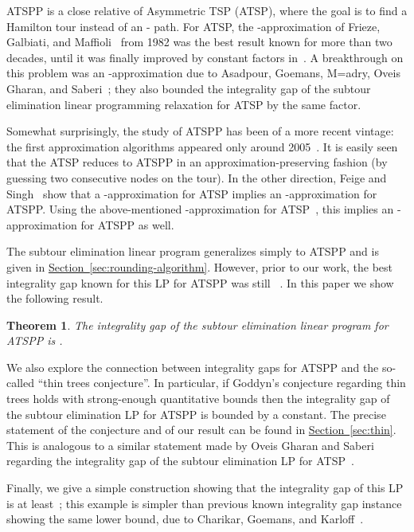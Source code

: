 \documentclass[11pt]{article}
\newcommand{\lref}[2][]{\hyperref[#2]{#1~\ref*{#2}}}
\newtheorem{theorem}{Theorem}[section]
\theoremstyle{definition}
\def\polhk#1{\setbox0=\hbox{#1}{\ooalign{\hidewidth\lower1.5ex\hbox{`}\hidewidth\crcr\unhbox0}}}
\begin{document}
ATSPP is a close relative of Asymmetric TSP
(ATSP), where the goal is to find a Hamilton tour instead of an -
path.  For ATSP, the -approximation of Frieze,
Galbiati, and Maffioli~\cite{FGM} from 1982 was the best result known
for more than two decades, until it was finally improved by constant
factors in~\cite{Blaser08,KLSS05,FS07}. A breakthrough on this problem
was an -approximation due to Asadpour, Goemans,
M{\polhk{a}}dry, Oveis Gharan, and Saberi~\cite{AGMSS}; they also
bounded the integrality gap of the subtour elimination linear
programming relaxation for ATSP by the same factor.

Somewhat surprisingly, the study of ATSPP has been of a more recent
vintage: the first approximation algorithms appeared only around
2005~\cite{LN08,CP07,FS07}. It is easily seen that the ATSP reduces to
ATSPP in an approximation-preserving fashion (by guessing two
consecutive nodes on the tour).  In the other direction, Feige and Singh~\cite{FS07}
show that a -approximation for ATSP implies an
-approximation for ATSPP. Using the above-mentioned
-approximation for ATSP~\cite{AGMSS}, this implies an
-approximation for ATSPP as well.

The subtour elimination linear program generalizes simply to ATSPP
and is given in \lref[Section]{sec:rounding-algorithm}. However,
prior to our work, the best integrality gap known for this LP for ATSPP was still ~\cite{FSS10}. In this paper we show the following result.

\begin{theorem}\label{thm:main}
  The integrality gap of the subtour elimination linear program for
  ATSPP is .
\end{theorem}

We also explore the connection between integrality gaps for ATSPP
and the so-called ``thin trees conjecture''. In particular, if Goddyn's conjecture
regarding thin trees holds with strong-enough quantitative bounds
then the integrality gap of the subtour elimination LP for ATSPP
is bounded by a constant. The precise statement of the conjecture and of
our result can be found in \lref[Section]{sec:thin}. This is analogous to
a similar statement made by Oveis Gharan and Saberi regarding
the integrality gap of the subtour elimination LP for ATSP~\cite{GS11}.

Finally, we give a simple construction showing that the integrality gap of
this LP is at least~; this example is simpler than previous known
integrality gap instance showing the same lower bound, due to Charikar,
Goemans, and Karloff~\cite{CGK06}.
\end{document}
